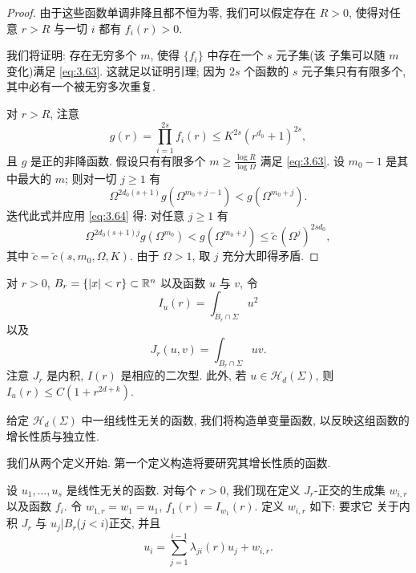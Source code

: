 \begin{proof}
由于这些函数单调非降且都不恒为零, 我们可以假定存在 $R>0$, 使得对任意
$r>R$ 与一切 $i$ 都有 $f_i(r)>0$.

我们将证明: 存在无穷多个 $m$, 使得 $\{f_i\}$ 中存在一个 $s$ 元子集(该
子集可以随 $m$ 变化)满足 \eqref{eq:3.63}. 这就足以证明引理; 因为 $2s$ 个函数的
$s$ 元子集只有有限多个, 其中必有一个被无穷多次重复.

对 $r>R$, 注意
\begin{equation}
g(r)=\prod_{i=1}^{2s}f_i(r)\leq K^{2s}(r^{d_0}+1)^{2s},
\label{eq:3.64}
\end{equation}
且 $g$ 是正的非降函数. 假设只有有限多个
$m\geq\frac{\log R}{\log\Omega}$ 满足 \eqref{eq:3.63}. 设 $m_0-1$ 是其中最大的
$m$; 则对一切 $j\geq1$ 有
\begin{equation}
\Omega^{2d_0(s+1)}g(\Omega^{m_0+j-1})<g(\Omega^{m_0+j}).
\label{eq:3.65}
\end{equation}
迭代此式并应用 \eqref{eq:3.64} 得: 对任意 $j\geq1$ 有
\begin{equation}
\Omega^{2d_0(s+1)j}g(\Omega^{m_0})<g(\Omega^{m_0+j})
 \leq\tilde{c}\,(\Omega^j)^{2sd_0},
\label{eq:3.66}
\end{equation}
其中 $\tilde{c}=\tilde{c}(s,m_0,\Omega,K)$. 由于 $\Omega>1$, 取 $j$
充分大即得矛盾.
\end{proof}

对 $r>0$, $B_r=\{|x|<r\}\subset\mathbb{R}^n$ 以及函数 $u$ 与 $v$, 令
\begin{equation}
I_u(r)=\int_{B_r\cap\Sigma}u^2
\label{eq:3.67}
\end{equation}
以及
\begin{equation}
J_r(u,v)=\int_{B_r\cap\Sigma}uv.
\label{eq:3.68}
\end{equation}
注意 $J_r$ 是内积, $I(r)$ 是相应的二次型. 此外, 若
$u\in\mathcal{H}_d(\Sigma)$, 则 $I_u(r)\leq C(1+r^{2d+k})$.

给定 $\mathcal{H}_d(\Sigma)$ 中一组线性无关的函数, 我们将构造单变量函数,
以反映这组函数的增长性质与独立性.

我们从两个定义开始. 第一个定义构造将要研究其增长性质的函数.

\begin{definition}[$w_{i,r}$ 与 $f_i$]
\label{def:3.20}
设 $u_1,\dots,u_s$ 是线性无关的函数. 对每个 $r>0$, 我们现在定义
$J_r$-正交的生成集 $w_{i,r}$ 以及函数 $f_i$. 令
$w_{1,r}=w_1=u_1$, $f_1(r)=I_{w_1}(r)$. 定义 $w_{i,r}$ 如下: 要求它
关于内积 $J_r$ 与 $u_j|B_r$($j<i$)正交, 并且
\begin{equation}
u_i=\sum_{j=1}^{i-1}\lambda_{ji}(r)u_j+w_{i,r}.
\label{eq:3.69}
\end{equation}
\end{definition}

